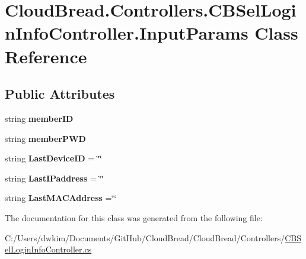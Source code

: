 \hypertarget{a00093}{}\section{Cloud\+Bread.\+Controllers.\+C\+B\+Sel\+Login\+Info\+Controller.\+Input\+Params Class Reference}
\label{a00093}
\subsection*{Public Attributes}
\begin{DoxyCompactItemize}
\item 
string {\bfseries member\+ID}\hypertarget{a00093_ada7036881426d4d249d51783fed5c968}{}\label{a00093_ada7036881426d4d249d51783fed5c968}

\item 
string {\bfseries member\+P\+WD}\hypertarget{a00093_a63889974827c41cd33c147821d097fcf}{}\label{a00093_a63889974827c41cd33c147821d097fcf}

\item 
string {\bfseries Last\+Device\+ID} = \char`\"{}\char`\"{}\hypertarget{a00093_a198ab2e794a4e4fc05e89c9f984ba4a1}{}\label{a00093_a198ab2e794a4e4fc05e89c9f984ba4a1}

\item 
string {\bfseries Last\+I\+Paddress} = \char`\"{}\char`\"{}\hypertarget{a00093_ad02b24584c0f2ef0e6fbcf4e9098dc0e}{}\label{a00093_ad02b24584c0f2ef0e6fbcf4e9098dc0e}

\item 
string {\bfseries Last\+M\+A\+C\+Address} =\char`\"{}\char`\"{}\hypertarget{a00093_a1513dd40a1c1d3b83584d18415b3ca6d}{}\label{a00093_a1513dd40a1c1d3b83584d18415b3ca6d}

\end{DoxyCompactItemize}


The documentation for this class was generated from the following file\+:\begin{DoxyCompactItemize}
\item 
C\+:/\+Users/dwkim/\+Documents/\+Git\+Hub/\+Cloud\+Bread/\+Cloud\+Bread/\+Controllers/\hyperlink{a00222}{C\+B\+Sel\+Login\+Info\+Controller.\+cs}\end{DoxyCompactItemize}

